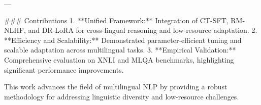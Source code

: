 ---

### Contributions
1. **Unified Framework:** Integration of CT-SFT, RM-NLHF, and DR-LoRA for cross-lingual reasoning and low-resource adaptation.
2. **Efficiency and Scalability:** Demonstrated parameter-efficient tuning and scalable adaptation across multilingual tasks.
3. **Empirical Validation:** Comprehensive evaluation on XNLI and MLQA benchmarks, highlighting significant performance improvements.

This work advances the field of multilingual NLP by providing a robust methodology for addressing linguistic diversity and low-resource challenges.